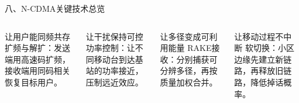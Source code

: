 \documentclass[aspectratio=169]{beamer}
\newcommand{\keypoint}[1]{\textcolor{DeepBlue}{\heiti #1}}
\begin{document}
\begin{frame}[t]{八、N-CDMA关键技术总览}
    \small
    \begin{columns}[T,totalwidth=\textwidth]
        \begin{block}{让用户能同频共存}
            \keypoint{扩频与解扩}：发送端用高速码扩频，接收端用同码相关恢复目标用户。
        \end{block}

        \begin{block}{让干扰保持可控}
            \keypoint{功率控制}：让不同移动台到达基站的功率接近，压制远近效应。
        \end{block}

        \begin{block}{让多径变成可利用能量}
            \keypoint{RAKE接收}：分别捕获可分辨多径，再按质量加权合并。
        \end{block}

        \begin{block}{让移动过程不中断}
            \keypoint{软切换}：小区边缘先建立新链路，再释放旧链路，降低掉话概率。
        \end{block}
    \end{columns}
\end{frame}
\end{document}
